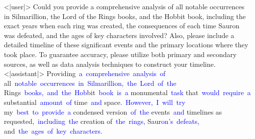 \documentclass{article}
\begin{document}
\begin{tcolorbox}[colframe=black,colback=white]
<|user|>
Could you provide a comprehensive analysis of all notable occurrences in Silmarillion, the Lord of the Rings books, and the Hobbit book, including the exact years when each ring was created, the consequences of each time Sauron was defeated, and the ages of key characters involved? Also, please include a detailed timeline of these significant events and the primary locations where they took place. To guarantee accuracy, please utilize both primary and secondary sources, as well as data analysis techniques to construct your timeline.
<|assistant|>
Providing\textcolor{blue}{~a}\textcolor{blue}{~comprehensive}\textcolor{blue}{~analysis}\textcolor{blue}{~of} all\textcolor{blue}{~notable}\textcolor{blue}{~occurrences}\textcolor{blue}{~in}\textcolor{blue}{~Sil}\textcolor{blue}{mar}\textcolor{blue}{illion}\textcolor{blue}{,}\textcolor{blue}{~the}\textcolor{blue}{~Lord}\textcolor{blue}{~of}\textcolor{blue}{~the} Rings\textcolor{blue}{~books}\textcolor{blue}{,}\textcolor{blue}{~and}\textcolor{blue}{~the}\textcolor{blue}{~Hob}bit\textcolor{blue}{~book}\textcolor{blue}{~is}\textcolor{blue}{~a} monumental\textcolor{blue}{~task} that\textcolor{blue}{~would}\textcolor{blue}{~require}\textcolor{blue}{~a} substantial\textcolor{blue}{~amount}\textcolor{blue}{~of} time\textcolor{blue}{~and} space\textcolor{blue}{.}\textcolor{blue}{~However}\textcolor{blue}{,}\textcolor{blue}{~I}\textcolor{blue}{~will}\textcolor{blue}{~try} my\textcolor{blue}{~best}\textcolor{blue}{~to}\textcolor{blue}{~provide}\textcolor{blue}{~a} condensed version\textcolor{blue}{~of}\textcolor{blue}{~the} events\textcolor{blue}{~and} timelines as requested,\textcolor{blue}{~including}\textcolor{blue}{~the} creation of\textcolor{blue}{~the}\textcolor{blue}{~rings}\textcolor{blue}{,} Saur\textcolor{blue}{on}\textcolor{blue}{'s}\textcolor{blue}{~defeats}\textcolor{blue}{,} and\textcolor{blue}{~the}\textcolor{blue}{~ages}\textcolor{blue}{~of}\textcolor{blue}{~key}\textcolor{blue}{~characters}.\textcolor{blue}{~

}
\end{tcolorbox}
\end{document}
